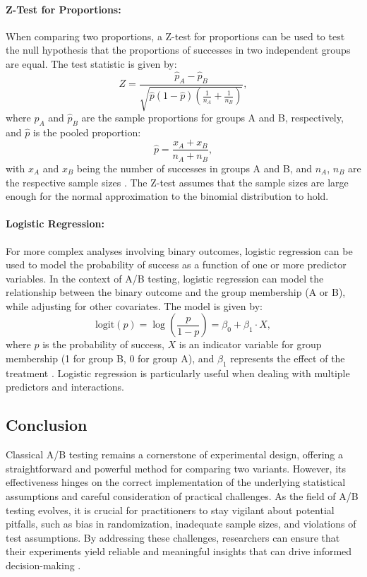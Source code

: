 \documentclass[magisterska, english]{pwr_wmat_praca_dyplomowa}
\theoremstyle{plain}
\numberwithin{theorem}{chapter}
\theoremstyle{definition}
\numberwithin{theorem}{chapter}
\begin{document}
\paragraph{Z-Test for Proportions:} When comparing two proportions, a Z-test for proportions can be used to test the null hypothesis that the proportions of successes in two independent groups are equal. The test statistic is given by:
\[
Z = \frac{\hat{p}_A - \hat{p}_B}{\sqrt{\hat{p}(1-\hat{p})\left(\frac{1}{n_A} + \frac{1}{n_B}\right)}},
\]
where $\hat{p}_A$ and $\hat{p}_B$ are the sample proportions for groups A and B, respectively, and $\hat{p}$ is the pooled proportion:
\[
\hat{p} = \frac{x_A + x_B}{n_A + n_B},
\]
with $x_A$ and $x_B$ being the number of successes in groups A and B, and $n_A$, $n_B$ are the respective sample sizes \cite{Newcombe1998}. The Z-test assumes that the sample sizes are large enough for the normal approximation to the binomial distribution to hold.

\paragraph{Logistic Regression:} For more complex analyses involving binary outcomes, logistic regression can be used to model the probability of success as a function of one or more predictor variables. In the context of A/B testing, logistic regression can model the relationship between the binary outcome and the group membership (A or B), while adjusting for other covariates. The model is given by:
\[
\text{logit}(p) = \log\left(\frac{p}{1-p}\right) = \beta_0 + \beta_1 \cdot X,
\]
where $p$ is the probability of success, $X$ is an indicator variable for group membership (1 for group B, 0 for group A), and $\beta_1$ represents the effect of the treatment \cite{Hosmer2013}. Logistic regression is particularly useful when dealing with multiple predictors and interactions.
\subsection{Conclusion}
Classical A/B testing remains a cornerstone of experimental design, offering a straightforward and powerful method for comparing two variants. However, its effectiveness hinges on the correct implementation of the underlying statistical assumptions and careful consideration of practical challenges. As the field of A/B testing evolves, it is crucial for practitioners to stay vigilant about potential pitfalls, such as bias in randomization, inadequate sample sizes, and violations of test assumptions. By addressing these challenges, researchers can ensure that their experiments yield reliable and meaningful insights that can drive informed decision-making \cite{Kohavi2013}.
\end{document}
